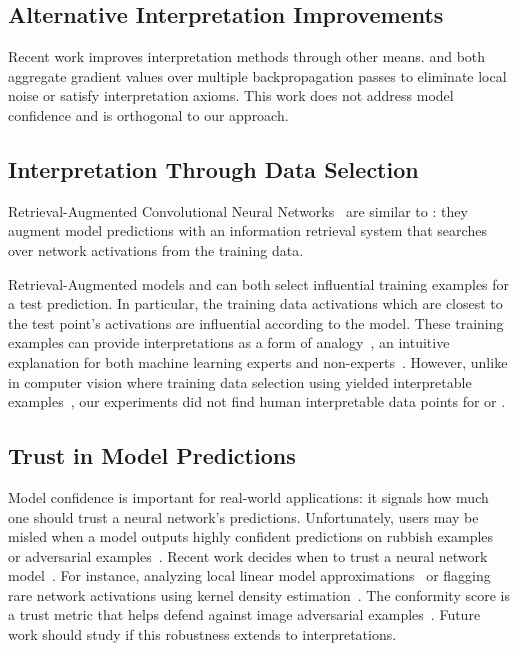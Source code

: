 \subsection{Alternative Interpretation Improvements}

Recent work improves interpretation methods through other
means. \citet{smilkov2017smoothgrad} and \citet{sundararajan2017axiomatic}
both aggregate gradient values over multiple
backpropagation passes to eliminate local noise or satisfy
interpretation axioms. This work does not address 
model confidence and is orthogonal to our \dknn{} approach. 
 
\subsection{Interpretation Through Data Selection}

Retrieval-Augmented Convolutional Neural Networks~\cite{zhao2018retrieval} are similar
to \dknn{}: they augment model predictions with an information
retrieval system that searches over network activations from the training data. 

Retrieval-Augmented models and \dknn{} can both select influential
training examples for a test prediction. In particular, the
training data activations which are closest to the test point's 
activations are influential according to the
model. These training examples
can provide interpretations as a form of analogy~\cite{caruana1999casebased}, an
intuitive explanation for both machine learning experts and non-experts~\cite{klein1989biases,
kim2014bayesian,
koh2017influence, wallace2018trick}. However, unlike in computer vision where
training data selection using \dknn{} yielded interpretable examples~\cite{papernot2018dknn},
our experiments did not find human interpretable data points for  or
. 
  		
\subsection{Trust in Model Predictions}

Model confidence is important for real-world
applications: it signals how much one should trust
a neural network's predictions. Unfortunately, users may be 
misled when a model outputs highly confident predictions on rubbish
examples~\cite{goodfellow2014explaining, nguyen2015fooled} or adversarial
examples~\cite{szegedy2013intriguing}. Recent work decides when
to trust a neural network model~\cite{ribeiro2016lime,
doshivelez2017towards, jiang2018trust}. For instance, analyzing local linear
model approximations~\cite{ribeiro2016lime} or flagging rare network activations
using kernel density estimation~\cite{jiang2018trust}. The \dknn{} conformity
score is a trust metric that helps defend against image adversarial
examples~\cite{papernot2018dknn}. Future work should study if this robustness
extends to interpretations. 
